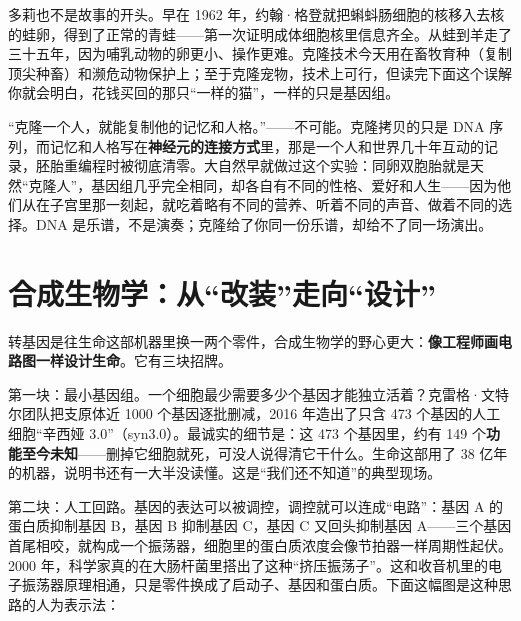 多莉也不是故事的开头。早在 1962 年，约翰·格登就把蝌蚪肠细胞的核移入去核的蛙卵，得到了正常的青蛙——第一次证明成体细胞核里信息齐全。从蛙到羊走了三十五年，因为哺乳动物的卵更小、操作更难。克隆技术今天用在畜牧育种（复制顶尖种畜）和濒危动物保护上；至于克隆宠物，技术上可行，但读完下面这个误解你就会明白，花钱买回的那只“一样的猫”，一样的只是基因组。

\begin{wuqu}
“克隆一个人，就能复制他的记忆和人格。”——不可能。克隆拷贝的只是 DNA 序列，而记忆和人格写在\textbf{神经元的连接方式}里，那是一个人和世界几十年互动的记录，胚胎重编程时被彻底清零。大自然早就做过这个实验：同卵双胞胎就是天然“克隆人”，基因组几乎完全相同，却各自有不同的性格、爱好和人生——因为他们从在子宫里那一刻起，就吃着略有不同的营养、听着不同的声音、做着不同的选择。DNA 是乐谱，不是演奏；克隆给了你同一份乐谱，却给不了同一场演出。
\end{wuqu}

\section{合成生物学：从“改装”走向“设计”}

转基因是往生命这部机器里换一两个零件，合成生物学的野心更大：\textbf{像工程师画电路图一样设计生命}。它有三块招牌。

第一块：最小基因组。一个细胞最少需要多少个基因才能独立活着？克雷格·文特尔团队把支原体近 1000 个基因逐批删减，2016 年造出了只含 473 个基因的人工细胞“辛西娅 3.0”（syn3.0）。最诚实的细节是：这 473 个基因里，约有 149 个\textbf{功能至今未知}——删掉它细胞就死，可没人说得清它干什么。生命这部用了 38 亿年的机器，说明书还有一大半没读懂。这是“我们还不知道”的典型现场。

第二块：人工回路。基因的表达可以被调控，调控就可以连成“电路”：基因 A 的蛋白质抑制基因 B，基因 B 抑制基因 C，基因 C 又回头抑制基因 A——三个基因首尾相咬，就构成一个振荡器，细胞里的蛋白质浓度会像节拍器一样周期性起伏。2000 年，科学家真的在大肠杆菌里搭出了这种“挤压振荡子”。这和收音机里的电子振荡器原理相通，只是零件换成了启动子、基因和蛋白质。下面这幅图是这种思路的人为表示法：

\begin{center}
\end{center}

